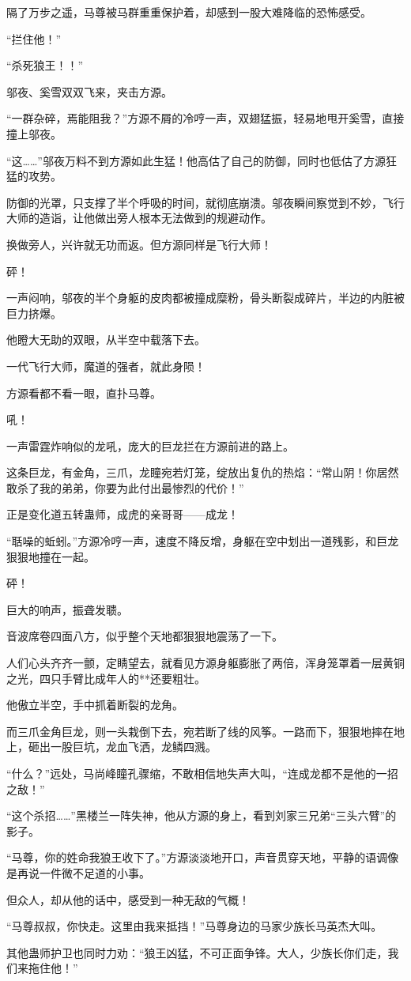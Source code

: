 \begin{this_body}
隔了万步之遥，马尊被马群重重保护着，却感到一股大难降临的恐怖感受。

“拦住他！”

“杀死狼王！！”

邬夜、奚雪双双飞来，夹击方源。

“一群杂碎，焉能阻我？”方源不屑的冷哼一声，双翅猛振，轻易地甩开奚雪，直接撞上邬夜。

“这……”邬夜万料不到方源如此生猛！他高估了自己的防御，同时也低估了方源狂猛的攻势。

防御的光罩，只支撑了半个呼吸的时间，就彻底崩溃。邬夜瞬间察觉到不妙，飞行大师的造诣，让他做出旁人根本无法做到的规避动作。

换做旁人，兴许就无功而返。但方源同样是飞行大师！

砰！

一声闷响，邬夜的半个身躯的皮肉都被撞成糜粉，骨头断裂成碎片，半边的内脏被巨力挤爆。

他瞪大无助的双眼，从半空中载落下去。

一代飞行大师，魔道的强者，就此身陨！

方源看都不看一眼，直扑马尊。

吼！

一声雷霆炸响似的龙吼，庞大的巨龙拦在方源前进的路上。

这条巨龙，有金角，三爪，龙瞳宛若灯笼，绽放出复仇的热焰：“常山阴！你居然敢杀了我的弟弟，你要为此付出最惨烈的代价！”

正是变化道五转蛊师，成虎的亲哥哥——成龙！

“聒噪的蚯蚓。”方源冷哼一声，速度不降反增，身躯在空中划出一道残影，和巨龙狠狠地撞在一起。

砰！

巨大的响声，振聋发聩。

音波席卷四面八方，似乎整个天地都狠狠地震荡了一下。

人们心头齐齐一颤，定睛望去，就看见方源身躯膨胀了两倍，浑身笼罩着一层黄铜之光，四只手臂比成年人的**还要粗壮。

他傲立半空，手中抓着断裂的龙角。

而三爪金角巨龙，则一头栽倒下去，宛若断了线的风筝。一路而下，狠狠地摔在地上，砸出一股巨坑，龙血飞洒，龙鳞四溅。

“什么？”远处，马尚峰瞳孔骤缩，不敢相信地失声大叫，“连成龙都不是他的一招之敌！”

“这个杀招……”黑楼兰一阵失神，他从方源的身上，看到刘家三兄弟“三头六臂”的影子。

“马尊，你的姓命我狼王收下了。”方源淡淡地开口，声音贯穿天地，平静的语调像是再说一件微不足道的小事。

但众人，却从他的话中，感受到一种无敌的气概！

“马尊叔叔，你快走。这里由我来抵挡！”马尊身边的马家少族长马英杰大叫。

其他蛊师护卫也同时力劝：“狼王凶猛，不可正面争锋。大人，少族长你们走，我们来拖住他！”

\end{this_body}

